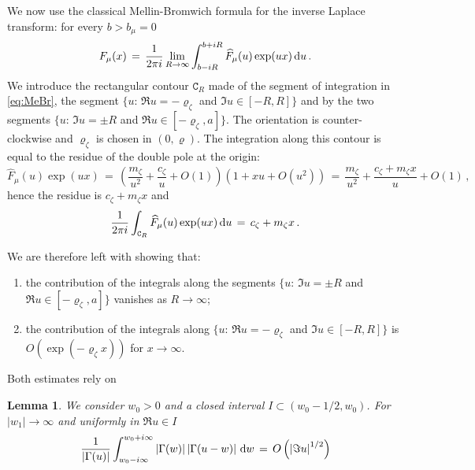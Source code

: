 \documentclass[reqno,11pt]{amsart}
\numberwithin{equation}{section}
\newtheorem{lemma}[theorem]{Lemma}
\newcommand{\dd}{\,\text{\rm d}}             %
\newcommand{\gz}{\zeta}
\newcommand{\gG}{\Gamma}
\begin{document}
 We now use the classical Mellin-Bromwich formula for the inverse Laplace transform: for every $b>b_\mu=0$ 
 \begin{equation}
 \label{eq:MeBr}
 F_\mu(x)\, =\,\frac {1}{ 2\pi i}\lim_{R \to \infty} \int_{b-i R}^{b+ iR} \widehat F_\mu(u) \exp(ux) \dd u\, .
 \end{equation}
 We introduce the rectangular contour $\mathtt{C}_R$ made of the segment of integration 
 in \eqref{eq:MeBr}, the segment $\{u: \, \Re u =-\varrho_\gz$ and $\Im u \in[-R, R]\}$ and by the two segments $\{u:\, \Im u = \pm R$ and $\Re u\in [-\varrho_\gz, a]\}$. The orientation is counter-clockwise and $\varrho_\gz $ is chosen in $(0, \varrho)$.
 The integration along this contour is equal to the residue of the double pole at the origin:
\begin{equation}
\widehat F_\mu(u) \exp(ux)\, =\,  \left(\frac {m_\gz} {u^2} +\frac{c_\gz} u +  O(1)\right)( 1+ xu + O(u^2))\,=\,
\frac {m_\gz} {u^2}
+ \frac {c_\gz +m_\gz x} u + O(1)\, ,
\end{equation}
hence the residue is $c_\gz +m_\gz x$ and 
\begin{equation}
\frac {1}{ 2\pi i} \int_{\mathtt{C}_R} \widehat F_\mu(u) \exp(ux) \dd u\, =\, c_\gz +m_\gz x\, .
\end{equation}

We are therefore left with  showing that:

\smallskip

\begin{enumerate}
\item
 the contribution of the integrals along the segments  
 $\{u:\, \Im u = \pm R$ and $\Re u\in [-\varrho_\gz, a]\}$ vanishes as $R\to \infty$;
 \item the contribution of the integrals along $\{u: \, \Re u =-\varrho_\gz$ and $\Im u \in[-R, R]\}$ is $O(\exp(-\varrho_\gz x))$ for $x \to \infty$. 
\end{enumerate}

 \smallskip 
 
 Both estimates rely on 
  
\medskip

\begin{lemma}
\label{th:gGctrl}
We consider $w_0>0$  and a closed interval $I\subset(w_0-1/2, w_0)$. For $ \vert w_1 \vert\to \infty$ and uniformly in $\Re u\in I$
\begin{equation}
\label{eq:gGctrl}
 \frac{1}{ \left \vert\gG(u)\right\vert} 
 \int_{w_0-i\infty}^{w_0 + i \infty} \left \vert  \gG (w)\right \vert
  \left \vert \gG(u-w) \right \vert \dd w\, =\, O \left( \left \vert \Im u \right \vert^{1/2}\right)
\end{equation}
\end{lemma}
\end{document}
